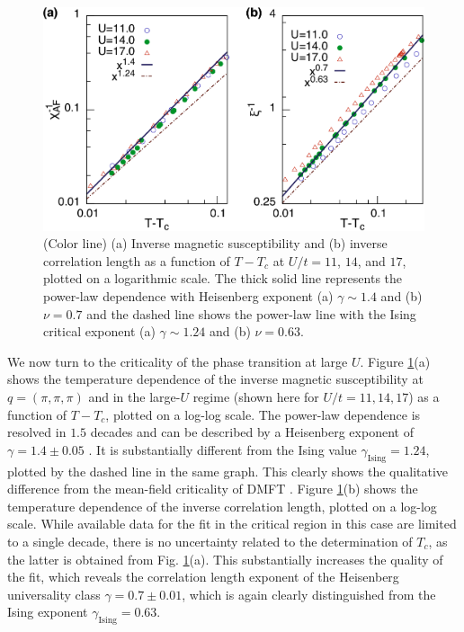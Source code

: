 \documentclass[aps,prb,twocolumn,amsmath,notitlepage,floatfix,footinbib,superscriptaddress,showpacs, showkeys]{revtex4-1}
\begin{document}
\begin{figure}[t]
\begin{center}
\includegraphics[width=\columnwidth]{fig5.pdf}\end{center}\vspace*{-1.5em}
\caption{(Color line) (a) Inverse magnetic susceptibility and (b) inverse correlation length as a function of $T-T_c$ at $U/t=11$, $14$, and $17$, plotted on a logarithmic scale. 
The thick solid line represents the power-law dependence with Heisenberg exponent (a) $\gamma \sim 1.4$ and (b) $\nu = 0.7$ and the dashed line shows the power-law line with the Ising critical exponent (a) $\gamma \sim 1.24$ and (b) $\nu = 0.63$.}
\label{fig:susc_cor_log}
\end{figure}

We now turn to the criticality of the phase transition at large $U$. 
Figure \ref{fig:susc_cor_log}(a) shows the temperature dependence of the inverse magnetic susceptibility at $q=(\pi, \pi, \pi)$ and in the large-$U$ regime (shown here for $U/t = 11, 14, 17$) as a function of $T-T_c$, plotted on a log-log scale. 
The power-law dependence is resolved in $1.5$ decades and can be described by a Heisenberg exponent of $\gamma = 1.4 \pm 0.05$ \cite{Holm1993}. 
It is substantially different from the Ising value $\gamma_{\mathrm{Ising}} = 1.24$, plotted by the dashed line in the same graph. This clearly shows the qualitative difference from the mean-field criticality of DMFT \cite{Byczuk2002a}. 
Figure \ref{fig:susc_cor_log}(b) shows the temperature dependence of the inverse correlation length, plotted on a log-log scale. 
While available data for the fit in the critical region in this case are limited to a single decade, there is no uncertainty related to the determination of  $T_c$, as the latter is obtained from Fig. \ref{fig:susc_cor_log}(a). 
This substantially increases the quality of the fit, which reveals the correlation length exponent of the Heisenberg universality class $\gamma = 0.7 \pm 0.01$, which is again clearly distinguished from the Ising exponent $\gamma_{\mathrm{Ising}} = 0.63$. 
\end{document}
